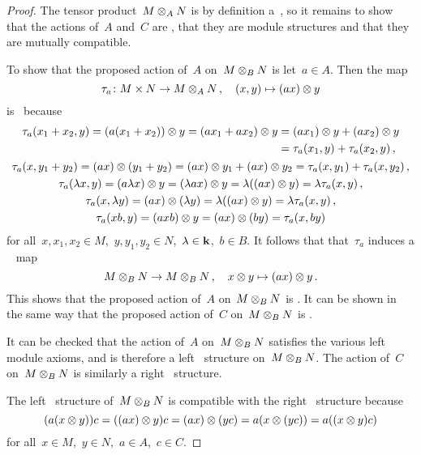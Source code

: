 \begin{proof}
  The tensor product~$M \otimes_A N$ is by definition a~{\module{$\kf$}}, so it remains to show that the actions of~$A$ and~$C$ are {\welldef}, that they are module structures and that they are mutually compatible.
  
  To show that the proposed action of~$A$ on~$M \otimes_B N$ is {\welldef} let~$a \in A$.
  Then the map
  \[
            \tau_a
    \colon  M \times N
    \to     M \otimes_A N \,,
    \quad   (x,y)
    \mapsto (ax) \otimes y
  \]
  is~{} because
  \begin{gather*}
    \begin{aligned}
          \tau_a(x_1 + x_2, y)
       =  (a(x_1 + x_2)) \otimes y
       =  (a x_1 + a x_2) \otimes y
      &=  (a x_1) \otimes y + (a x_2) \otimes y \\
      &=  \tau_a(x_1, y) + \tau_a(x_2, y) \,,
    \end{aligned}
  \\
      \tau_a(x, y_1 + y_2)
    = (ax) \otimes (y_1 + y_2)
    = (ax) \otimes y_1 + (ax) \otimes y_2
    = \tau_a(x, y_1) + \tau_a(x, y_2) \,,
  \\
      \tau_a(\lambda x, y)
    = (a \lambda x) \otimes y
    = (\lambda a x) \otimes y
    = \lambda ((ax) \otimes y)
    = \lambda \tau_a(x,y) \,,
  \\
      \tau_a(x, \lambda y)
    = (ax) \otimes (\lambda y)
    = \lambda ((ax) \otimes y)
    = \lambda \tau_a(x,y) \,,
  \\
      \tau_a(xb,y)
    = (axb) \otimes y
    = (ax) \otimes (by)
    = \tau_a(x,by)
  \end{gather*}
  for all~$x, x_1, x_2 \in M$,~$y, y_1, y_2 \in N$,~$\lambda \in \mathbf{k}$,~$b \in B$.
  It follows that that~$\tau_a$ induces a {\welldef}~{\klin} map
  \[
            M \otimes_B N
    \to     M \otimes_B N \,,
    \quad   x \otimes y
    \mapsto (ax) \otimes y \,.
  \]
  This shows that the proposed action of~$A$ on~$M \otimes_B N$ is {\welldef}.
  It can be shown in the same way that the proposed action of~$C$ on~$M \otimes_B N$ is {\welldef}.
  
  It can be checked that the action of~$A$ on~$M \otimes_B N$ satisfies the various left module axioms, and is therefore a left~{} structure on~$M \otimes_B N$.
  The action of~$C$ on~$M \otimes_B N$ is similarly a right~{} structure.
  
  The left~{} structure of~$M \otimes_B N$ is compatible with the right~{} structure because
  \[
      ( a(x \otimes y) )c
    = ((ax) \otimes y)c
    = (ax) \otimes (yc)
    = a( x \otimes (yc) )
    = a( (x \otimes y)c )
  \]
  for all~$x \in M$,~$y \in N$,~$a \in A$,~$c \in C$.
\end{proof}


